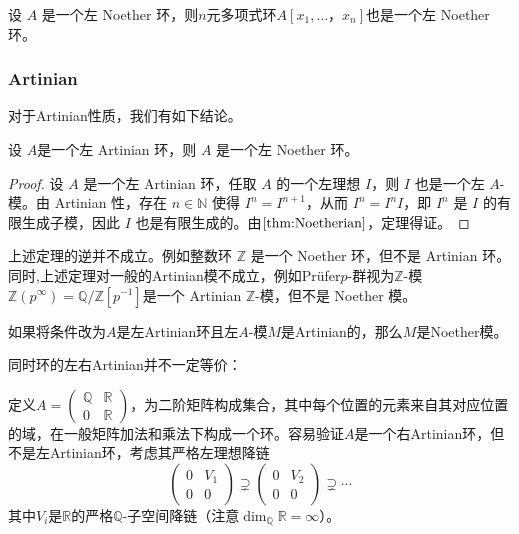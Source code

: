 \begin{theorem}[Hilbert基底定理]
    设 $A$ 是一个左 Noether 环，则$n$元多项式环$A[x_1,\dots，x_n]$也是一个左 Noether 环。
\end{theorem}
\subsubsection{Artinian}
对于Artinian性质，我们有如下结论。
\begin{theorem}
    \label{thm:Akizuki-Hopkins-Levitzki}
    设 $A$是一个左 Artinian 环，则 $A$ 是一个左 Noether 环。
    \begin{proof}
        设 $A$ 是一个左 Artinian 环，任取 $A$ 的一个左理想 $I$，则 $I$ 也是一个左 $A$-模。由 Artinian 性，存在 $n\in \mathbb{N}$ 使得 $I^n=I^{n+1}$，从而 $I^n=I^n I$，即 $I^n$ 是 $I$ 的有限生成子模，因此 $I$ 也是有限生成的。由$\ref{thm:Noetherian}$，定理得证。
    \end{proof}
\end{theorem}
\begin{remark}
    上述定理的逆并不成立。例如整数环 $\mathbb{Z}$ 是一个 Noether 环，但不是 Artinian 环。
    同时,上述定理对一般的Artinian模不成立，例如Prüfer$p$-群视为$\mathbb{Z}$-模 $\mathbb{Z}(p^\infty) = \mathbb{Q}/\mathbb{Z}[p^{-1}]$是一个 Artinian $\mathbb{Z}$-模，但不是 Noether 模。
\end{remark}
\begin{remark}[广义版本]
    如果将条件改为$A$是左Artinian环且左$A$-模$M$是Artinian的，那么$M$是Noether模。
\end{remark}
同时环的左右Artinian并不一定等价：
\begin{example}
    定义$A=\left(\begin{matrix}
                \mathbb{Q} & \mathbb{R} \\
                0          & \mathbb{R}
            \end{matrix}\right)$，为二阶矩阵构成集合，其中每个位置的元素来自其对应位置的域，在一般矩阵加法和乘法下构成一个环。容易验证$A$是一个右Artinian环，但不是左Artinian环，考虑其严格左理想降链
    \begin{equation*}
        \left(\begin{matrix}
            0 & V_1 \\
            0 & 0
        \end{matrix}\right) \supsetneq \left(\begin{matrix}
            0 & V_{2} \\
            0 & 0
        \end{matrix}\right) \supsetneq \cdots
    \end{equation*}
    其中$V_i$是$\mathbb{R}$的严格$\mathbb{Q}$-子空间降链（注意$\dim_\mathbb{Q} \mathbb{R} = \infty$）。
\end{example}



